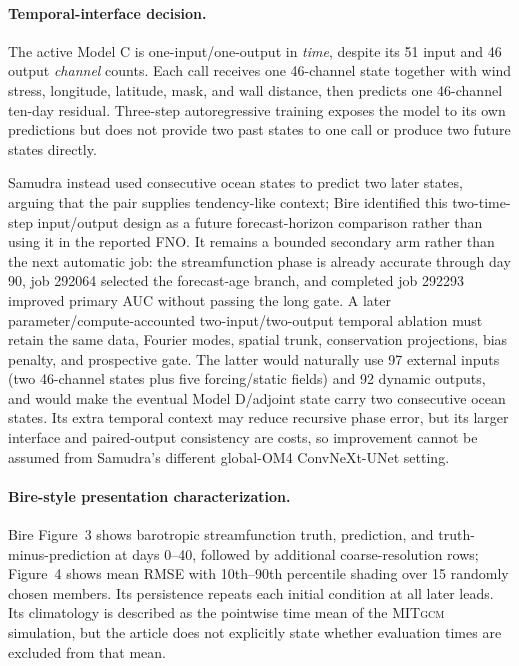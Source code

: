 \documentclass[11pt]{article}
\newcommand{\MITgcm}{\textsc{MITgcm}}
\begin{document}
\paragraph{Temporal-interface decision.}
The active Model C is one-input/one-output in \emph{time}, despite its
51 input and 46 output \emph{channel} counts.  Each call receives one 46-channel
state together with wind stress, longitude, latitude, mask, and wall distance, then
predicts one 46-channel ten-day residual.  Three-step autoregressive training exposes
the model to its own predictions but does not provide two past states to one call or
produce two future states directly.

Samudra instead used consecutive ocean states to predict two later states, arguing that
the pair supplies tendency-like context; Bire identified this two-time-step input/output
design as a future forecast-horizon comparison rather than using it in the reported
FNO.  It remains a bounded secondary arm rather than the next automatic job: the
streamfunction phase is already accurate through day 90, job 292064 selected the
forecast-age branch, and completed job 292293 improved primary AUC without passing
the long gate.  A later parameter/compute-accounted two-input/two-output temporal
ablation must retain the same data, Fourier modes, spatial trunk, conservation
projections, bias penalty, and prospective gate.  The latter
would naturally use 97 external inputs (two
46-channel states plus five forcing/static fields) and 92 dynamic outputs, and would
make the eventual Model D/adjoint state carry two consecutive ocean states.  Its extra
temporal context may reduce recursive phase error, but its larger interface and
paired-output consistency are costs, so improvement cannot be assumed from Samudra's
different global-OM4 ConvNeXt-UNet setting.

\paragraph{Bire-style presentation characterization.}
Bire Figure~3 shows barotropic streamfunction truth, prediction, and
truth-minus-prediction at days 0--40, followed by additional coarse-resolution rows;
Figure~4 shows mean RMSE with 10th--90th percentile shading over 15 randomly chosen
members.  Its persistence repeats each initial condition at all later leads.  Its
climatology is described as the pointwise time mean of the \MITgcm{} simulation, but
the article does not explicitly state whether evaluation times are excluded from that
mean.
\end{document}
